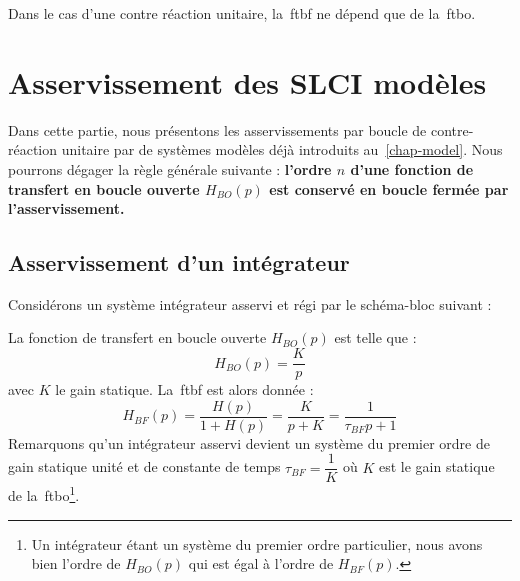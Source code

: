 Dans le cas d'une contre réaction unitaire, la~\gls{ftbf} ne dépend 
que de la~\gls{ftbo}.


\section{Asservissement des SLCI modèles}

Dans cette partie, nous présentons les asservissements par boucle 
de contre-réaction unitaire par de systèmes modèles déjà introduits 
au~\cref{chap-model}. Nous pourrons dégager la règle générale suivante :
\textbf{l'ordre $n$ d'une fonction de transfert en boucle ouverte $H_{BO}(p)$
est conservé en boucle fermée par l'asservissement.}

\subsection{Asservissement d'un intégrateur}

Considérons un système intégrateur asservi et régi par le schéma-bloc suivant :
\begin{center}
\end{center}

La fonction de transfert en boucle ouverte $H_{BO}(p)$ est telle que :
$$
H_{BO}(p)=\dfrac{K}{p}
$$
avec $K$ le gain statique. 
La~\gls{ftbf} est alors donnée :
$$
H_{BF}(p)=\dfrac{H(p)}{1+H(p)}=\dfrac{K}{p+K}=\dfrac{1}{\tau_{BF} p+1}
$$
Remarquons qu'un intégrateur asservi devient un système du premier 
ordre de gain statique unité et de constante de temps $\tau_{BF}=\dfrac{1}{K}$ 
où $K$ est le gain statique de la~\gls{ftbo}\footnote{Un intégrateur étant 
un système du premier ordre particulier, nous avons bien l'ordre de $H_{BO}(p)$ 
qui est égal à l'ordre de $H_{BF}(p)$.}. 

